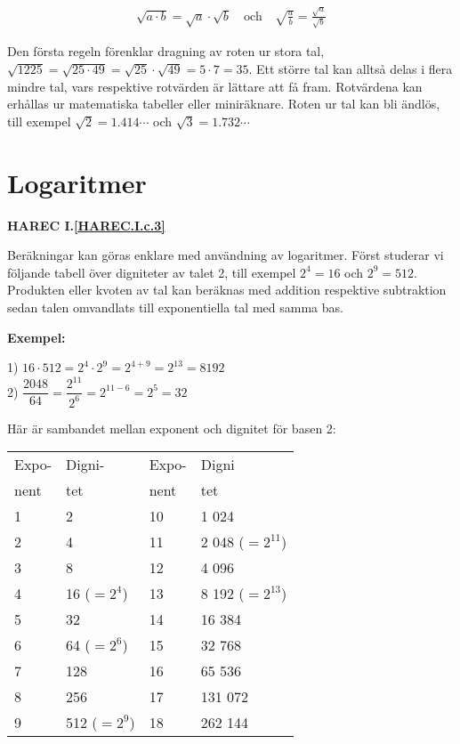 \begin{gather*}
  \sqrt{a \cdot b} = \sqrt{a} \cdot \sqrt{b}
  \quad \text{och} \quad
  \sqrt{\frac{a}{b}} = \frac{\sqrt{a}}{\sqrt{b}}
\end{gather*}

Den första regeln förenklar dragning av roten ur stora tal,
\(\sqrt{1225} = \sqrt{25 \cdot 49} = \sqrt{25} \cdot \sqrt{49} = 5 \cdot 7 = 35\).
Ett större tal kan alltså delas i flera mindre tal, vars respektive rotvärden är
lättare att få fram.
Rotvärdena kan erhållas ur matematiska tabeller eller miniräknare.
Roten ur tal kan bli ändlös, till exempel
\(\sqrt{2} = 1.414\cdots\) och \(\sqrt{3} = 1.732\cdots\)

\section{Logaritmer}
\label{logaritmer}
\textbf{HAREC I.\ref{HAREC.I.c.3}\label{myHAREC.I.c.3}}

Beräkningar kan göras enklare med användning av logaritmer.
Först studerar vi följande tabell över digniteter av talet 2,
till exempel \(2^4 = 16\) och \(2^9 = 512\).
Produkten eller kvoten av tal kan beräknas med addition respektive subtraktion
sedan talen omvandlats till exponentiella tal med samma bas.

\textbf{Exempel:}

1) \(16 \cdot 512 = 2^4 \cdot 2^9 =2^{4+9} = 2^{13} = 8192\)\\
2) \(\dfrac{2048}{64} = \dfrac{2^{11}}{2^6} =2^{11-6} =2^5 = 32\)

Här är sambandet mellan exponent och dignitet för basen 2:

\begin{tabular}{ll|ll}
Expo- & Digni-       & Expo- & Digni            \\
nent  & tet          & nent  & tet              \\ \hline
1     & 2            & 10    & 1 024            \\
2     & 4            & 11    & 2 048 (\(=2^{11}\)) \\
3     & 8            & 12    & 4 096            \\
4     & 16 (\(=2^4\))  & 13    & 8 192 (\(=2^{13}\)) \\
5     & 32           & 14    & 16 384           \\
6     & 64 (\(=2^6\))  & 15    & 32 768           \\
7     & 128          & 16    & 65 536           \\
8     & 256          & 17    & 131 072          \\
9     & 512 (\(=2^9\)) & 18    & 262 144
\end{tabular}

